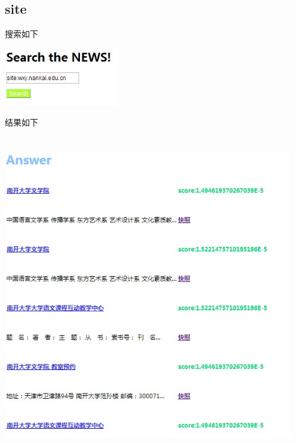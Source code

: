 ﻿\documentclass[UTF8]{ctexart}
\begin{document}
\begin{flushleft}
\subsection{site}
搜索如下
\par{}
\includegraphics[width=2.00in,height=1.00in]{28.jpg}
\par{}
结果如下
\par{}
\includegraphics[width=5.00in,height=5.50in]{27.jpg}
\par{}

\end{flushleft}
\end{document}
